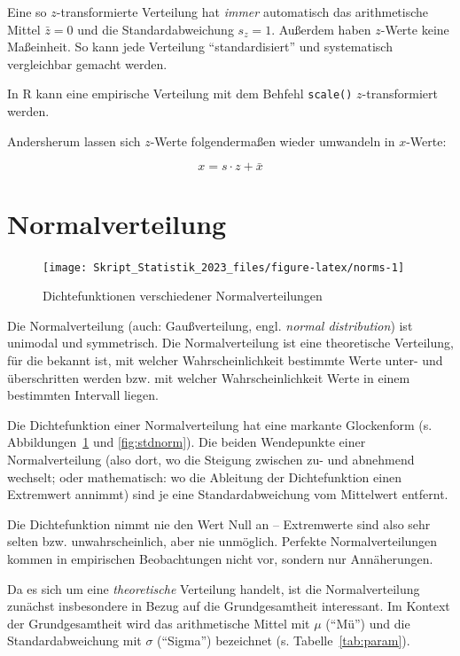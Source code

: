 \documentclass[
  11pt,
  ngerman,
  a4paper,
]{report}
\newenvironment{rtip}{
  \medskip
  \begin{tcolorbox}[colframe=purple,colback=light_gray,title=Softwarehinweis]
}{
  \end{tcolorbox}
  \medskip
}
\begin{document}
Eine so \(z\)-transformierte Verteilung hat \emph{immer} automatisch das arithmetische Mittel \(\bar{z}=0\) und die Standardabweichung \(s_z=1\). Außerdem haben \(z\)-Werte keine Maßeinheit. So kann jede Verteilung \enquote{standardisiert} und systematisch vergleichbar gemacht werden.

\begin{rtip}
In R kann eine empirische Verteilung mit dem Behfehl \verb|scale()| $z$-transformiert werden.
\end{rtip}

Andersherum lassen sich \(z\)-Werte folgendermaßen wieder umwandeln in \(x\)-Werte:

\[
  x=s\cdot z+\bar{x}
  \label{eq:zrev}
\]

\hypertarget{normalverteilung}{%
\section{Normalverteilung}\label{normalverteilung}}

\begin{figure}[b]

{\centering \texttt{[image: Skript\_Statistik\_2023\_files/figure-latex/norms-1]} 

}

\caption{Dichtefunktionen verschiedener Normalverteilungen}\label{fig:norms}
\end{figure}

Die Normalverteilung (auch: Gaußverteilung, engl. \emph{normal distribution}) ist unimodal und symmetrisch. Die Normalverteilung ist eine theoretische Verteilung, für die bekannt ist, mit welcher Wahrscheinlichkeit bestimmte Werte unter- und überschritten werden bzw. mit welcher Wahrscheinlichkeit Werte in einem bestimmten Intervall liegen.

Die Dichtefunktion einer Normalverteilung hat eine markante Glockenform (s. Abbildungen~\ref{fig:norms} und \ref{fig:stdnorm}). Die beiden Wendepunkte einer Normalverteilung (also dort, wo die Steigung zwischen zu- und abnehmend wechselt; oder mathematisch: wo die Ableitung der Dichtefunktion einen Extremwert annimmt) sind je eine Standardabweichung vom Mittelwert entfernt.

Die Dichtefunktion nimmt nie den Wert Null an -- Extremwerte sind also sehr selten bzw. unwahrscheinlich, aber nie unmöglich. Perfekte Normalverteilungen kommen in empirischen Beobachtungen nicht vor, sondern nur Annäherungen.

Da es sich um eine \emph{theoretische} Verteilung handelt, ist die Normalverteilung zunächst insbesondere in Bezug auf die Grundgesamtheit interessant. Im Kontext der Grundgesamtheit wird das arithmetische Mittel mit \(\mu\) (\enquote{Mü}) und die Standardabweichung mit \(\sigma\) (\enquote{Sigma}) bezeichnet (s. Tabelle~\ref{tab:param}).
\end{document}
